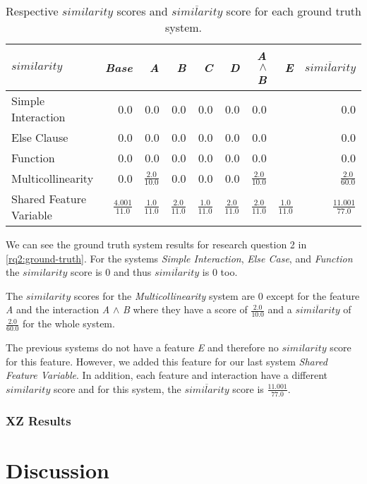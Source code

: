 \begin{table}[H]
    \centering
    \begin{tabular}{lrrrrrrrr}    \toprule
    $similarity$ & \emph{Base} & \emph{A} & \emph{B} & \emph{C} & \emph{D} & \emph{A} $\land$ \emph{B} & \emph{E} & $\overline{similarity}$ \\ \midrule
    Simple Interaction & 0.0 & 0.0 & 0.0 & 0.0 & 0.0 & 0.0 &  & 0.0  \\
    Else Clause & 0.0 & 0.0 & 0.0 & 0.0 & 0.0 & 0.0 & & 0.0 \\
    Function & 0.0 & 0.0 & 0.0 & 0.0 & 0.0 & 0.0 &  & 0.0\\
    Multicollinearity & 0.0 & $\frac{2.0}{10.0}$ & 0.0 & 0.0 & 0.0 & $\frac{2.0}{10.0}$  &  & $\frac{2.0}{60.0}$   \\
    Shared Feature Variable & $\frac{4.001}{11.0}$ & $\frac{1.0}{11.0}$ & $\frac{2.0}{11.0}$ &$\frac{1.0}{11.0}$ & $\frac{2.0}{11.0}$ & $\frac{2.0}{11.0}$ & $\frac{1.0}{11.0}$ & $\frac{11.001}{77.0}$ \\ \bottomrule
    \end{tabular}
    \caption{Respective $similarity$ scores and $\overline{similarity}$ score for each ground truth system.}
    \label{rq2:ground-truth}
\end{table}

We can see the ground truth system results for research question 2 in \autoref{rq2:ground-truth}.  
For the systems \emph{Simple Interaction}, \emph{Else Case}, and \emph{Function} the $similarity$ score is $0$ and thus 
$\overline{similarity}$ is $0$ too. 

The $similarity$ scores for the \emph{Multicollinearity} system are $0$ except for the feature \emph{A} and the interaction
\emph{A} $\land$ \emph{B} where they have a score of $\frac{2.0}{10.0}$ and a $\overline{similarity}$ of $\frac{2.0}{60.0}$
for the whole system.

The previous systems do not have a feature \emph{E} and therefore no $similarity$ score for this feature. 
However, we added this feature for our last system \emph{Shared Feature Variable}. 
In addition, each feature and interaction have a different $similarity$ score and for this system, 
the $\overline{similarity}$ score is $\frac{11.001}{77.0}$.

\subsubsection*{XZ Results}

\section{Discussion}\label{sec:discussion}


